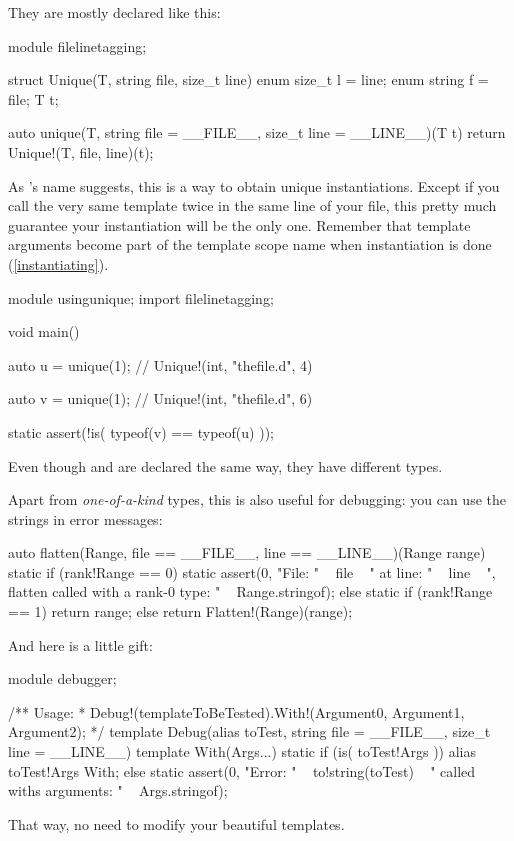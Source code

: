 They are mostly declared like this:

\begin{dcode}
module filelinetagging;

struct Unique(T, string file, size_t line)
{
    enum size_t l = line;
    enum string f = file;
    T t;
}

auto unique(T, string file = __FILE__, size_t line = __LINE__)(T t)
{
    return Unique!(T, file, line)(t);
}
\end{dcode}

As 's name suggests, this is a way to obtain unique instantiations. Except if you call the very same template twice in the same line of your file, this pretty much guarantee your instantiation will be the only one. Remember that template arguments become part of the template scope name when instantiation is done (\ref{instantiating}).

\begin{dcode}
module usingunique;
import filelinetagging;

void main()
{
    auto u = unique(1); // Unique!(int, "thefile.d", 4)

    auto v = unique(1); // Unique!(int, "thefile.d", 6)

    static assert(!is( typeof(v) == typeof(u) ));
}
\end{dcode}

Even though  and  are declared the same way, they have different types.

Apart from \emph{one-of-a-kind} types, this is also useful for debugging: you can use the strings in error messages:

\begin{dcode}
auto flatten(Range, file == __FILE__, line == __LINE__)(Range range)
{ 
    static if (rank!Range == 0)
        static assert(0, "File: " ~ file ~ " at line: " ~ line 
                       ~ ", flatten called with a rank-0 type: " 
                       ~ Range.stringof);
    else static if (rank!Range == 1)
        return range;
    else
        return Flatten!(Range)(range);
}
\end{dcode}

And here is a little gift:

\begin{dcode}
module debugger;

/** Usage:
 * Debug!(templateToBeTested).With!(Argument0, Argument1, Argument2);
 */
template Debug(alias toTest, string file = __FILE__, size_t line = __LINE__)
{
    template With(Args...)
    {
        static if (is( toTest!Args ))
            alias toTest!Args With;
        else
            static assert(0, "Error: " ~ to!string(toTest)
                           ~ " called withs arguments: "
                           ~ Args.stringof);
    }
}
\end{dcode}

That way, no need to modify your beautiful templates.



